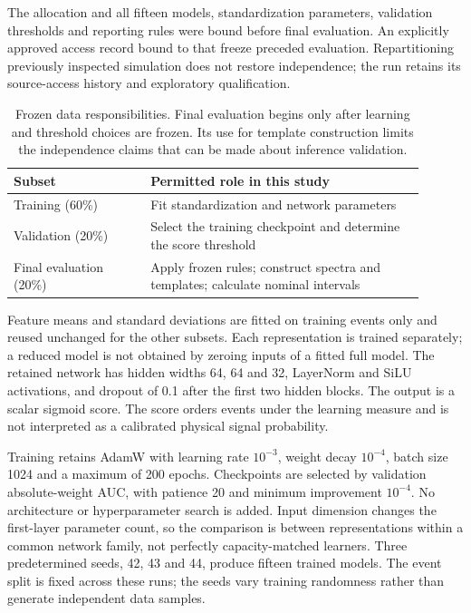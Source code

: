 \documentclass[aps,prd,reprint,superscriptaddress,nofootinbib,longbibliography,floatfix]{revtex4-2}
\let\label\OriginalLaTeXLabel
\begin{document}
The allocation and all fifteen models, standardization parameters, validation
thresholds and reporting rules were bound before final evaluation. An explicitly
approved access record bound to that freeze preceded evaluation. Repartitioning
previously inspected simulation does not restore independence; the run retains
its source-access history and exploratory qualification.

\begin{table}[tbp]
\caption{Frozen data responsibilities. Final evaluation begins only after
learning and threshold choices are frozen. Its use for template construction
limits the independence claims that can be made about inference validation.}
\label{tab:roles}
\centering
\begin{tabular}{@{}p{0.30\linewidth}p{0.60\linewidth}@{}}
\toprule
\textbf{Subset} & \textbf{Permitted role in this study} \\
\midrule
Training (60\%) & Fit standardization and network parameters \\
Validation (20\%) & Select the training checkpoint and determine the score threshold \\
\raggedright Final evaluation (20\%) & Apply frozen rules; construct spectra and templates; calculate nominal intervals \\
\bottomrule
\end{tabular}
\end{table}

Feature means and standard deviations are fitted on training events only and reused
unchanged for the other subsets. Each representation is trained separately; a reduced model
is not obtained by zeroing inputs of a fitted full model. The retained network has hidden
widths 64, 64 and 32, LayerNorm and SiLU activations, and dropout of 0.1 after the first two
hidden blocks. The output is a scalar sigmoid score. The score orders events under the
learning measure and is not interpreted as a calibrated physical signal probability.

Training retains AdamW with learning rate \(10^{-3}\), weight decay \(10^{-4}\), batch size
1024 and a maximum of 200 epochs. Checkpoints are selected by validation absolute-weight
AUC, with patience 20 and minimum improvement \(10^{-4}\). No architecture or hyperparameter
search is added. Input dimension changes the first-layer parameter count, so the comparison
is between representations within a common network family, not perfectly capacity-matched
learners. Three predetermined seeds, 42, 43 and 44, produce fifteen trained models. The
event split is fixed across these runs; the seeds vary training randomness rather than
generate independent data samples.
\end{document}
